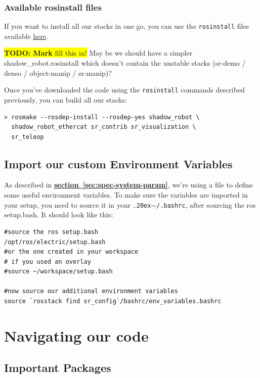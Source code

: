 \documentclass[12pt]{article}
\newcommand{\todo}[1]{\colorbox{yellow}{\textbf{TODO: #1} fill this in!}}
\newcommand{\linuxtilde}{\raise.20ex\hbox{$\scriptstyle\mathtt{\sim}$}}
\newcommand{\link}[1]{\hyperref[sec:#1]{\textbf{section~\ref*{sec:#1}}}}
\begin{document}
\subsubsection{Available rosinstall files}
\par If you want to install all our stacks in one go, you can use the \texttt{rosinstall} files available \href{http://bazaar.launchpad.net/~shadowrobot/sr-build-tools/trunk/view/head:/data/shadow_robot.rosinstall}{here}.

\todo{Mark} May be we should have a simpler shadow\_robot.rosinstall which doesn't contain the unstable stacks (sr-demo / denso / object-manip / sr-manip)?

\par Once you've downloaded the code using the \texttt{rosinstall} commands described previously, you can build all our stacks:
  \begin{lstlisting}[escapeinside='']
> rosmake --rosdep-install --rosdep-yes shadow_robot \
  shadow_robot_ethercat sr_contrib sr_visualization \
  sr_teleop
  \end{lstlisting}

\subsection{Import our custom Environment Variables}
\label{sec:import-vars}
\par As described in \link{spec-system-param}, we're using a file to define some useful environment variables. To make sure the variables are imported in your setup, you need to source it in your \texttt{\linuxtilde/.bashrc}, after sourcing the ros setup.bash. It should look like this:
  \begin{lstlisting}[title={\textbf{\linuxtilde/.bashrc}}, upquote=true]
#source the ros setup.bash
/opt/ros/electric/setup.bash
#or the one created in your workspace
# if you used an overlay
#source ~/workspace/setup.bash

#now source our additional environment variables
source `rosstack find sr_config`/bashrc/env_variables.bashrc
  \end{lstlisting}

\newpage

\section{Navigating our code}
\label{sec:navigate}

\subsection{Important Packages}
\label{sec:important-packages}
\end{document}
